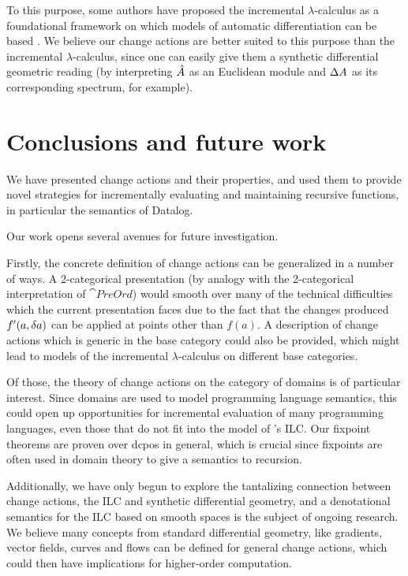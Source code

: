 To this purpose, some authors have proposed the incremental $\lambda$-calculus
as a foundational framework on which models of automatic differentiation can
be based \autocite{kelly2016evolving}. We believe our change actions are better suited
to this purpose than the incremental $\lambda$-calculus, since one can easily give them a
synthetic differential geometric reading (by interpreting $\hat{A}$ as an Euclidean module and $\Delta A$
as its corresponding spectrum, for example).

\section{Conclusions and future work}

We have presented change actions and their properties, and used them to provide novel
strategies for incrementally evaluating and maintaining recursive functions, in
particular the semantics of Datalog.

Our work opens several avenues for future investigation.

Firstly, the concrete definition of change actions can be generalized in a number of
ways. A 2-categorical presentation (by analogy with the 2-categorical interpretation
of $\cat{PreOrd}$) would smooth over many of the technical difficulties which
the current presentation faces due to the fact that the changes produced
$f'(a, \delta a)$ can be applied at points other than $f(a)$.
A description of change actions which is generic in
the base category could also be provided, which might lead to models of
the incremental $\lambda$-calculus on different base categories. 

Of those, the theory of change actions on the category of domains is of particular interest. Since
domains are used to model programming language semantics, this could
open up opportunities for incremental evaluation of many programming languages,
even those that do not fit into the model of \citeauthor{cai2014changes}'s ILC.
Our fixpoint theorems are proven over dcpos in general, which is crucial since
fixpoints are often used in domain theory to give a semantics to recursion.

Additionally, we have only begun to explore the tantalizing connection between
change actions, the ILC and synthetic
differential geometry, and a denotational semantics for the
ILC based on smooth spaces is the subject of ongoing research. We believe many concepts
from standard differential geometry, like gradients, vector fields, curves and flows can
be defined for general change actions, which could then have implications for higher-order
computation.

